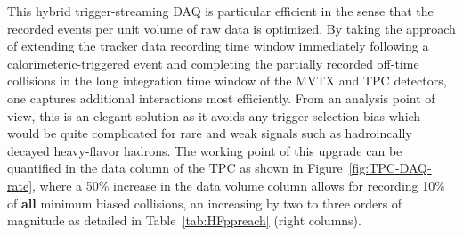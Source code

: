 This hybrid trigger-streaming DAQ is particular efficient in the sense that the recorded events per unit volume of raw data is optimized.  By taking the approach of extending the tracker data recording time window immediately following a calorimeteric-triggered event and completing the partially recorded off-time collisions in the long integration time window of the MVTX and TPC detectors, one captures additional interactions most efficiently. 
From an analysis point of view, this is an elegant solution as it avoids any trigger selection bias which would be quite complicated for rare and weak signals such as hadroincally decayed heavy-flavor hadrons.
The working point of this upgrade can be quantified in the data column of the TPC as shown in Figure~\ref{fig:TPC-DAQ-rate}, where a 50\% increase in the data volume column allows for recording 10\% of {\bf all} minimum biased collisions, an increasing by two to three orders of magnitude as detailed in Table~\ref{tab:HFppreach} (right columns). 

 



 




